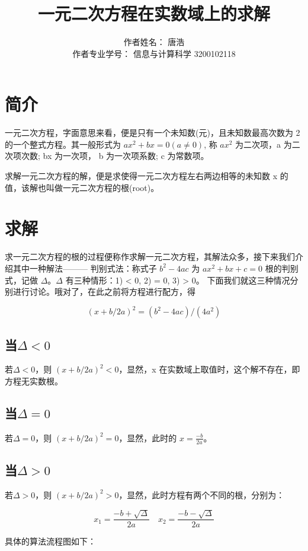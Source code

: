 \documentclass[10pt]{ctexart}
\title{一元二次方程在实数域上的求解}
\author{作者姓名： 唐浩 \\ 作者专业学号： 信息与计算科学 3200102118}
\begin{document}
\maketitle

\section{简介}
一元二次方程，字面意思来看，便是只有一个未知数(元)，且未知数最高次数为 2 的一个整式方程。其一般形式为 $ax^2 + bx = 0 (a \ne 0)$, 称 $ax^2$ 为二次项，a 为二次项次数; bx 为一次项， b 为一次项系数; c 为常数项。

求解一元二次方程的解，便是求使得一元二次方程左右两边相等的未知数 x 的值，该解也叫做一元二次方程的根(root)。

\section{求解}
求一元二次方程的根的过程便称作求解一元二次方程，其解法众多，接下来我们介绍其中一种解法——— 判别式法：称式子 $b^2 - 4ac$ 为 $ax^2 + bx + c = 0$ 根的判别式，记做 $\varDelta$。$\varDelta$ 有三种情形：1) < 0, 2) = 0, 3) > 0。 下面我们就这三种情况分别进行讨论。哦对了，在此之前将方程进行配方，得

\[
(x + b/2a)^2 = (b^2 - 4ac)/(4a^2)
\]

\subsection{当$\varDelta < 0$}

若$\varDelta < 0$，则 $(x + b/2a)^2 < 0$，显然，x 在实数域上取值时，这个解不存在，即方程无实数根。

\subsection{当$\varDelta = 0$}

若$\varDelta = 0$，则 $(x + b/2a)^2 = 0$，显然，此时的 $x = \frac{-b}{2a}$。

\subsection{当$\varDelta > 0$}

若$\varDelta > 0$，则 $(x + b/2a)^2 > 0$，显然，此时方程有两个不同的根，分别为：

\[
x_1 = \frac{-b+\sqrt{\varDelta}}{2a} \quad  x_2 = \frac{-b-\sqrt{\varDelta}}{2a}
\]

具体的算法流程图如下：
\end{document}
